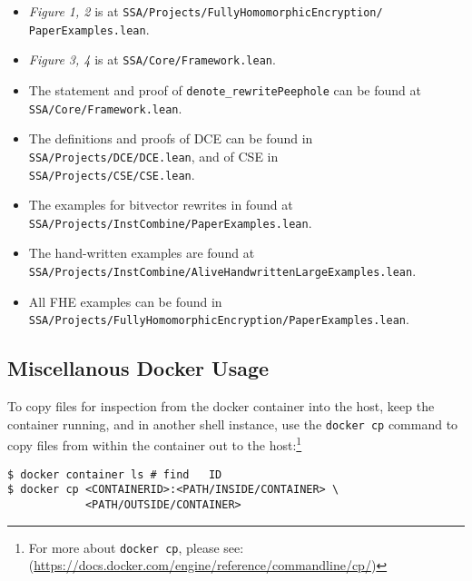 \documentclass{sigplanconf}
\begin{document}
\begin{itemize}
\item \emph{Figure 1, 2} is at \texttt{SSA/Projects/FullyHomomorphicEncryption/\\PaperExamples.lean}.
\item \emph{Figure 3, 4} is at \texttt{SSA/Core/Framework.lean}.
\item The statement and proof of \texttt{denote\_rewritePeephole} can be found at 
\texttt{SSA/Core/Framework.lean}. 
\item The definitions and proofs of DCE can be found in \\
\texttt{SSA/Projects/DCE/DCE.lean}, and of CSE in \\\texttt{SSA/Projects/CSE/CSE.lean}.
\item The examples for bitvector rewrites in found at \\\texttt{SSA/Projects/InstCombine/PaperExamples.lean}.
\item The hand-written examples are found at \\\texttt{SSA/Projects/InstCombine/AliveHandwrittenLargeExamples.lean}.
\item All FHE examples can be found in \\\texttt{SSA/Projects/FullyHomomorphicEncryption/PaperExamples.lean}.
\end{itemize}

\subsection{Miscellanous Docker Usage}
To copy files for inspection from the docker container into the host,
 keep the container running, and in another
shell instance, use the \texttt{docker cp}
command to copy files from within the container out to the host:\footnote{For more about \texttt{docker cp}, please see: (\url{https://docs.docker.com/engine/reference/commandline/cp/})}

\begin{verbatim}
$ docker container ls # find   ID
$ docker cp <CONTAINERID>:<PATH/INSIDE/CONTAINER> \
            <PATH/OUTSIDE/CONTAINER>
\end{verbatim}





\end{document}

